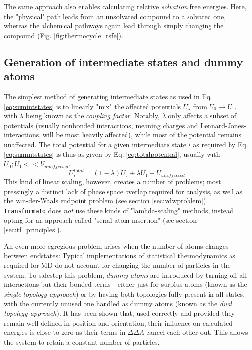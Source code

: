 \documentclass[oneside]{scrreprt}
\begin{document}
The same approach also enables calculating relative \emph{solvation} free energies. Here, the "physical" path leads from an unsolvated compound to a solvated one, whereas the alchemical pathways again lead through simply changing the compound (Fig. \ref{fig:thermocycle_rsfe}).

\subsection{Generation of intermediate states and dummy atoms} \label{sec:intstatesanddummys}

The simplest method of generating intermediate states as used in Eq. \ref{eq:sumintstates} is to linearly "mix" the affected potentials $U_\lambda$ from $U_0 \rightarrow U_1$, with $\lambda$ being known as the \emph{coupling factor}. Notably, $\lambda$ only affects a subset of potentials (usually nonbonded interactions, meaning charges and Lennard-Jones-interactions, will be most heavily affected), while most of the potential remains unaffected. The total potential for a given intermediate state $i$ as required by Eq. \ref{eq:sumintstates} is thus as given by Eq. \ref{eq:totalpotential}, usually with $U_0; U_1 << U_{unaffected}$.
\begin{equation}
U^{total}_i   = (1-\lambda)U_0 + \lambda U_1  + U_{unaffected}
\label{eq:totalpotential}
\end{equation}
This kind of linear scaling, however, creates a number of problems; most pressingly a distinct lack of phase space overlap required for analysis, as well as the van-der-Waals endpoint problem (see section \ref{sec:vdwproblem}). \texttt{Transformato} does \emph{not} use these kinds of "lambda-scaling" methods, instead opting for an approach called "serial atom insertion" (see section \ref{sec:tf_principles}).

An even more egregious problem arises when the number of atoms changes between endstates: Typical implementations of statistical thermodynamics as required for MD do not account for changing the number of particles in the system. To sidestep this problem, \emph{dummy atoms} are introduced by turning off all interactions but their bonded terms - either just for surplus atoms (known as the \emph{single topology approach}) or by having both topologies fully present in all states, with the currently unused one handled as dummy atoms (known as the \emph{dual topology approach}). It has been shown that, used correctly and provided they remain well-defined in position and orientation, their influence on calculated energies is close to zero as their terms in $\Delta \Delta A$  cancel each other out\cite{fleckDummyAtomsAlchemical2021}. This allows the system to retain a constant number of particles.
\end{document}
